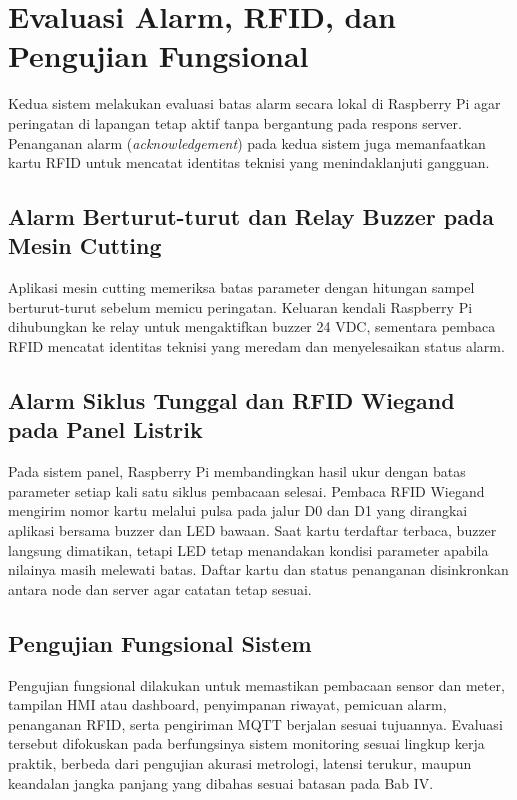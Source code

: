 \section{Evaluasi Alarm, RFID, dan Pengujian Fungsional}

Kedua sistem melakukan evaluasi batas alarm secara lokal di Raspberry Pi agar peringatan di lapangan tetap aktif tanpa bergantung pada respons server. Penanganan alarm (\textit{acknowledgement}) pada kedua sistem juga memanfaatkan kartu RFID untuk mencatat identitas teknisi yang menindaklanjuti gangguan.

\subsection{Alarm Berturut-turut dan Relay Buzzer pada Mesin Cutting}

Aplikasi mesin cutting memeriksa batas parameter dengan hitungan sampel berturut-turut sebelum memicu peringatan. Keluaran kendali Raspberry Pi dihubungkan ke relay untuk mengaktifkan buzzer 24 VDC, sementara pembaca RFID mencatat identitas teknisi yang meredam dan menyelesaikan status alarm.

\subsection{Alarm Siklus Tunggal dan RFID Wiegand pada Panel Listrik}

Pada sistem panel, Raspberry Pi membandingkan hasil ukur dengan batas parameter setiap kali satu siklus pembacaan selesai. Pembaca RFID Wiegand mengirim nomor kartu melalui pulsa pada jalur D0 dan D1 yang dirangkai aplikasi bersama buzzer dan LED bawaan. Saat kartu terdaftar terbaca, buzzer langsung dimatikan, tetapi LED tetap menandakan kondisi parameter apabila nilainya masih melewati batas. Daftar kartu dan status penanganan disinkronkan antara node dan server agar catatan tetap sesuai.

\subsection{Pengujian Fungsional Sistem}

Pengujian fungsional dilakukan untuk memastikan pembacaan sensor dan meter, tampilan HMI atau dashboard, penyimpanan riwayat, pemicuan alarm, penanganan RFID, serta pengiriman MQTT berjalan sesuai tujuannya. Evaluasi tersebut difokuskan pada berfungsinya sistem monitoring sesuai lingkup kerja praktik, berbeda dari pengujian akurasi metrologi, latensi terukur, maupun keandalan jangka panjang yang dibahas sesuai batasan pada Bab IV.
